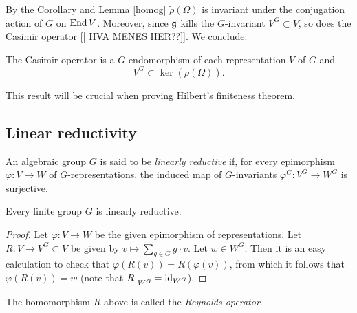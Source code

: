 \documentclass[11pt, english]{article}
\begin{document}
By the Corollary and Lemma \ref{homog}  $\tilde \rho(\Omega)$ is invariant under the conjugation action of $G$ on $\operatorname{End} V$. Moreover, since $\mathfrak g$ kills the $G$-invariant $V^G \subset V$, so does the Casimir operator [[ HVA MENES HER??]]. We conclude:

\begin{corr}
\label{korrker}
The Casimir operator is a $G$-endomorphism of each representation $V$ of $G$ and 
$$
V^G \subset \ker ( \tilde \rho(\Omega)).
$$
\end{corr}

This result will be crucial when proving Hilbert's finiteness theorem.

\subsection{Linear reductivity}

\begin{defi}
An algebraic group $G$ is said to be \emph{linearly reductive} if, for every epimorphism $\varphi:V \to W$ of $G$-representations, the induced map of $G$-invariants $\varphi^G:V^G \to W^G$ is surjective.
\end{defi}

\begin{prop}
Every finite group $G$ is linearly reductive.
\end{prop}

\begin{proof}
Let $\varphi: V \to W$ be the given epimorphism of representations. Let $ R:V \to V^G \subset V$ be given by $v \mapsto \sum_{g \in G} g\cdot v$. Let $w \in W^G$. Then it is an easy calculation to check that $\varphi(R(v))=R(\varphi(v))$, from which it follows that $\varphi(R(v))=w$ (note that $\restr{R}{W^G}=\id_{W^G}$).
\end{proof}

The homomorphism $R$ above is called the \emph{Reynolds operator}.
\end{document}
